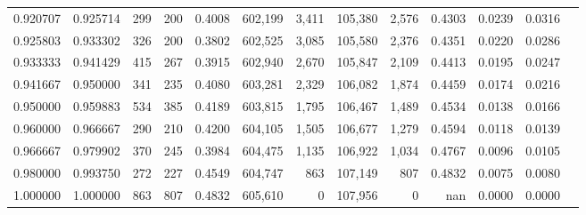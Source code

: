 \begin{tabular}{rrrrrrrrrrrrr}
0.920707 & 0.925714 &    299 &   200 &                                     0.4008 & 602,199 &   3,411 & 105,380 &   2,576 & 0.4303 & 0.0239 & 0.0316 \\
0.925803 & 0.933302 &    326 &   200 &                                     0.3802 & 602,525 &   3,085 & 105,580 &   2,376 & 0.4351 & 0.0220 & 0.0286 \\
0.933333 & 0.941429 &    415 &   267 &                                     0.3915 & 602,940 &   2,670 & 105,847 &   2,109 & 0.4413 & 0.0195 & 0.0247 \\
0.941667 & 0.950000 &    341 &   235 &                                     0.4080 & 603,281 &   2,329 & 106,082 &   1,874 & 0.4459 & 0.0174 & 0.0216 \\
0.950000 & 0.959883 &    534 &   385 &                                     0.4189 & 603,815 &   1,795 & 106,467 &   1,489 & 0.4534 & 0.0138 & 0.0166 \\
0.960000 & 0.966667 &    290 &   210 &                                     0.4200 & 604,105 &   1,505 & 106,677 &   1,279 & 0.4594 & 0.0118 & 0.0139 \\
0.966667 & 0.979902 &    370 &   245 &                                     0.3984 & 604,475 &   1,135 & 106,922 &   1,034 & 0.4767 & 0.0096 & 0.0105 \\
0.980000 & 0.993750 &    272 &   227 &                                     0.4549 & 604,747 &     863 & 107,149 &     807 & 0.4832 & 0.0075 & 0.0080 \\
1.000000 & 1.000000 &    863 &   807 &                                     0.4832 & 605,610 &       0 & 107,956 &       0 &    nan & 0.0000 & 0.0000 \\
\bottomrule
\end{tabular}
